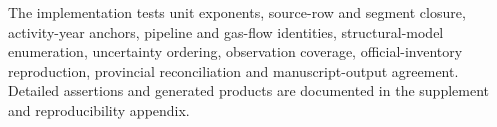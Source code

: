 The implementation tests unit exponents, source-row and segment closure, activity-year anchors,
pipeline and gas-flow identities, structural-model enumeration, uncertainty ordering,
observation coverage, official-inventory reproduction, provincial reconciliation and
manuscript-output agreement. Detailed assertions and generated products are documented in the
supplement and reproducibility appendix.
